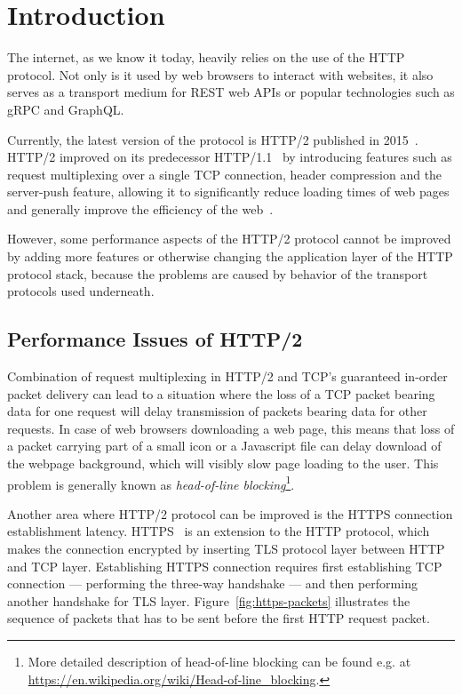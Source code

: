 \chapter{Introduction}

The internet, as we know it today, heavily relies on the use of the HTTP protocol. Not only is it
used by web browsers to interact with websites, it also serves as a transport medium for REST web
APIs or popular technologies such as gRPC and GraphQL\@.

Currently, the latest version of the protocol is HTTP/2 published in 2015~\cite{rfc7540}. HTTP/2
improved on its predecessor HTTP/1.1~\cite{rfc7230} by introducing features such as request
multiplexing over a single TCP connection, header compression and the server-push feature, allowing
it to significantly reduce loading times of web pages and generally improve the efficiency of the
web~\cite{deSaxce2015}.

However, some performance aspects of the HTTP/2 protocol cannot be improved by adding more features
or otherwise changing the application layer of the HTTP protocol stack, because the problems are
caused by behavior of the transport protocols used underneath.

\section{Performance Issues of HTTP/2}

Combination of request multiplexing in HTTP/2 and TCP's guaranteed in-order packet delivery can lead
to a situation where the loss of a TCP packet bearing data for one request will delay transmission
of packets bearing data for other requests. In case of web browsers downloading a web page, this
means that loss of a packet carrying part of a small icon or a Javascript file can delay download of
the webpage background, which will visibly slow page loading to the user. This problem is generally
known as \textit{head-of-line blocking}\footnote{More detailed description of head-of-line blocking
  can be found e.g\@. at \url{https://en.wikipedia.org/wiki/Head-of-line_blocking}.}.

Another area where HTTP/2 protocol can be improved is the HTTPS connection establishment latency.
HTTPS~\cite{rfc2818} is an extension to the HTTP protocol, which makes the connection encrypted by
inserting TLS protocol layer between HTTP and TCP layer. Establishing HTTPS connection requires
first establishing TCP connection --- performing the three-way handshake --- and then performing
another handshake for TLS layer. Figure~\ref{fig:https-packets} illustrates the sequence of packets
that has to be sent before the first HTTP request packet.


